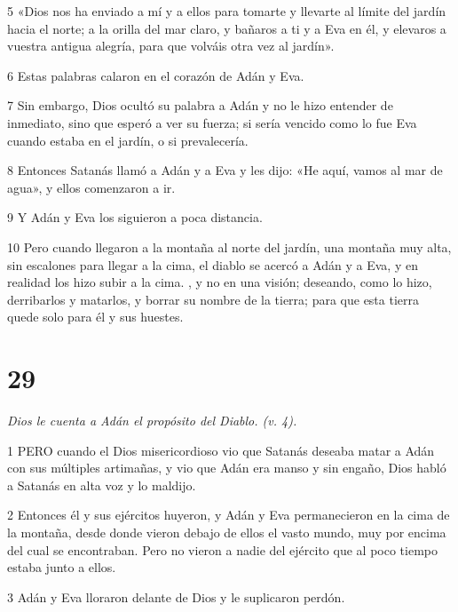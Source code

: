\par 5 «Dios nos ha enviado a mí y a ellos para tomarte y llevarte al límite del jardín hacia el norte; a la orilla del mar claro, y bañaros a ti y a Eva en él, y elevaros a vuestra antigua alegría, para que volváis otra vez al jardín».

\par 6 Estas palabras calaron en el corazón de Adán y Eva.

\par 7 Sin embargo, Dios ocultó su palabra a Adán y no le hizo entender de inmediato, sino que esperó a ver su fuerza; si sería vencido como lo fue Eva cuando estaba en el jardín, o si prevalecería.

\par 8 Entonces Satanás llamó a Adán y a Eva y les dijo: «He aquí, vamos al mar de agua», y ellos comenzaron a ir.

\par 9 Y Adán y Eva los siguieron a poca distancia.

\par 10 Pero cuando llegaron a la montaña al norte del jardín, una montaña muy alta, sin escalones para llegar a la cima, el diablo se acercó a Adán y a Eva, y en realidad los hizo subir a la cima. , y no en una visión; deseando, como lo hizo, derribarlos y matarlos, y borrar su nombre de la tierra; para que esta tierra quede solo para él y sus huestes.



\chapter{29}

\par \textit{Dios le cuenta a Adán el propósito del Diablo. (v. 4).}

\par 1 PERO cuando el Dios misericordioso vio que Satanás deseaba matar a Adán con sus múltiples artimañas, y vio que Adán era manso y sin engaño, Dios habló a Satanás en alta voz y lo maldijo.

\par 2 Entonces él y sus ejércitos huyeron, y Adán y Eva permanecieron en la cima de la montaña, desde donde vieron debajo de ellos el vasto mundo, muy por encima del cual se encontraban. Pero no vieron a nadie del ejército que al poco tiempo estaba junto a ellos.

\par 3 Adán y Eva lloraron delante de Dios y le suplicaron perdón.

